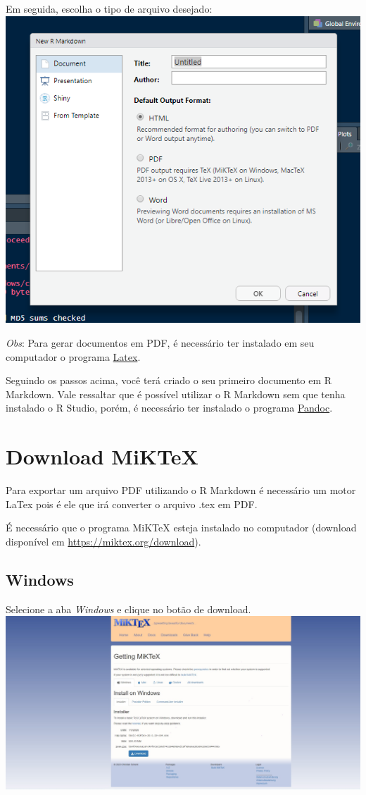 \documentclass[
]{book}
\begin{document}
Em seguida, escolha o tipo de arquivo desejado:
\includegraphics{img/file.png}

\emph{Obs}: Para gerar documentos em PDF, é necessário ter instalado em seu computador o programa \protect\hyperlink{download-rmd-e-latex}{Latex}.

Seguindo os passos acima, você terá criado o seu primeiro documento em R Markdown. Vale ressaltar que é possível utilizar o R Markdown sem que tenha instalado o R Studio, porém, é necessário ter instalado o programa \href{https://pandoc.org}{Pandoc}.

\hypertarget{download-miktex}{%
\section{Download MiKTeX}\label{download-miktex}}

Para exportar um arquivo PDF utilizando o R Markdown é necessário um motor LaTex pois é ele que irá converter o arquivo .tex em PDF.

É necessário que o programa MiKTeX esteja instalado no computador (download disponível em \url{https://miktex.org/download}).

\hypertarget{windows}{%
\subsection{Windows}\label{windows}}

Selecione a aba \emph{Windows} e clique no botão de download.
\includegraphics{img/download_windowns_MiKTex.jpg}
\end{document}
